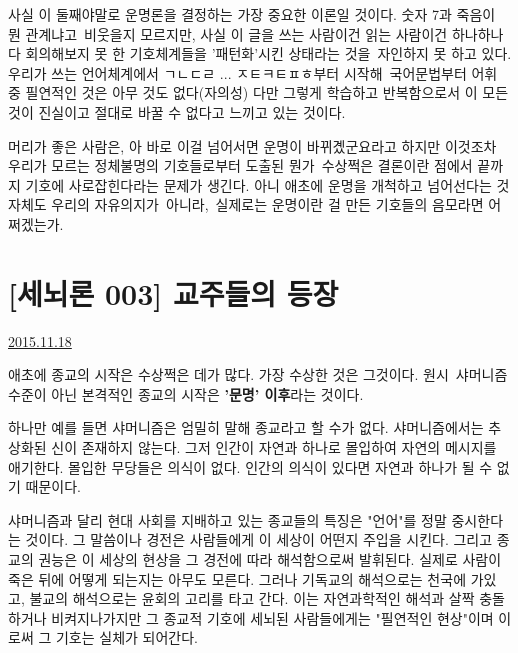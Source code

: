 사실 이 둘째야말로 운명론을 결정하는 가장 중요한 이론일 것이다.
숫자 7과 죽음이 뭔 관계냐고 비웃을지 모르지만, 사실 이 글을 쓰는 사람이건 읽는 사람이건
하나하나 다 회의해보지 못 한 기호체계들을 '패턴화'시킨 상태라는 것을 자인하지 못 하고 있다.
우리가 쓰는 언어체계에서 ㄱㄴㄷㄹ ... ㅈㅌㅋㅌㅍㅎ부터 시작해 국어문법부터 어휘 중 필연적인 것은 아무 것도 없다(자의성)
다만 그렇게 학습하고 반복함으로서 이 모든 것이 진실이고 절대로 바꿀 수 없다고 느끼고 있는 것이다.
\vspace{5mm}

머리가 좋은 사람은, 아 바로 이걸 넘어서면 운명이 바뀌곘군요라고 하지만
이것조차 우리가 모르는 정체불명의 기호들로부터 도출된 뭔가 수상쩍은 결론이란 점에서 끝까지 기호에 사로잡힌다라는 문제가 생긴다.
아니 애초에 운명을 개척하고 넘어선다는 것 자체도 우리의 자유의지가 아니라, 실제로는 운명이란 걸 만든 기호들의 음모라면 어쩌겠는가.
\vspace{5mm}






\section{[세뇌론 003] 교주들의 등장}
\href{https://www.kockoc.com/Apoc/499321}{2015.11.18}

\vspace{5mm}

애초에 종교의 시작은 수상쩍은 데가 많다.
가장 수상한 것은 그것이다. 원시 샤머니즘 수준이 아닌 본격적인 종교의 시작은 \textbf{'문명' 이후}라는 것이다.
\vspace{5mm}

하나만 예를 들면 샤머니즘은 엄밀히 말해 종교라고 할 수가 없다.
샤머니즘에서는 추상화된 신이 존재하지 않는다. 그저 인간이 자연과 하나로 몰입하여 자연의 메시지를 애기한다.
몰입한 무당들은 의식이 없다. 인간의 의식이 있다면 자연과 하나가 될 수 없기 때문이다.
\vspace{5mm}

샤머니즘과 달리 현대 사회를 지배하고 있는 종교들의 특징은 "언어"를 정말 중시한다는 것이다.
그 말씀이나 경전은 사람들에게 이 세상이 어떤지 주입을 시킨다.
그리고 종교의 권능은 이 세상의 현상을 그 경전에 따라 해석함으로써 발휘된다.
실제로 사람이 죽은 뒤에 어떻게 되는지는 아무도 모른다.
그러나 기독교의 해석으로는 천국에 가있고, 불교의 해석으로는 윤회의 고리를 타고 간다.
이는 자연과학적인 해석과 살짝 충돌하거나 비켜지나가지만
그 종교적 기호에 세뇌된 사람들에게는 "필연적인 현상"이며 이로써 그 기호는 실체가 되어간다.
\vspace{5mm}


